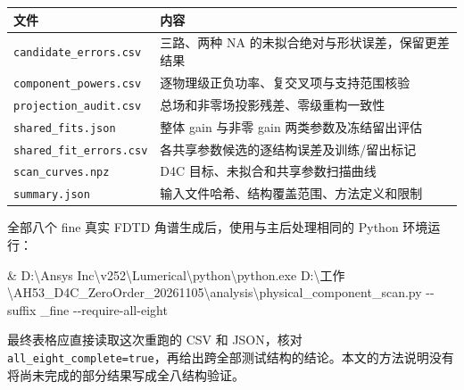 \documentclass[
  chinese,
  UTF8,
  a4paper,
  11pt]{ctexart}
\newenvironment{Shaded}{}{}
\newcommand{\NormalTok}[1]{#1}
\newcommand{\OperatorTok}[1]{\textcolor[rgb]{0.40,0.40,0.40}{#1}}
\newcommand{\StringTok}[1]{\textcolor[rgb]{0.25,0.44,0.63}{#1}}
\newcounter{none} %
\begin{document}
{\def\LTcaptype{none} %
\begin{longtable}[]{@{}
  >{\raggedright\arraybackslash}p{}
  >{\raggedright\arraybackslash}p{}@{}}
\toprule\noalign{}
\begin{minipage}[b]{\linewidth}\raggedright
文件
\end{minipage} & \begin{minipage}[b]{\linewidth}\raggedright
内容
\end{minipage} \\
\midrule\noalign{}
\endhead
\bottomrule\noalign{}
\endlastfoot
\texttt{candidate\_errors.csv} & 三路、两种 NA
的未拟合绝对与形状误差，保留更差结果 \\
\texttt{component\_powers.csv} &
逐物理级正负功率、复交叉项与支持范围核验 \\
\texttt{projection\_audit.csv} & 总场和非零场投影残差、零级重构一致性 \\
\texttt{shared\_fits.json} & 整体 gain 与非零 gain
两类参数及冻结留出评估 \\
\texttt{shared\_fit\_errors.csv} &
各共享参数候选的逐结构误差及训练/留出标记 \\
\texttt{scan\_curves.npz} & D4C 目标、未拟合和共享参数扫描曲线 \\
\texttt{summary.json} & 输入文件哈希、结构覆盖范围、方法定义和限制 \\
\end{longtable}
}

全部八个 fine 真实 FDTD 角谱生成后，使用与主后处理相同的 Python
环境运行：

\begin{Shaded}
\begin{Highlighting}[]
\OperatorTok{\&} \StringTok{\textquotesingle{}D:\textbackslash{}Ansys Inc\textbackslash{}v252\textbackslash{}Lumerical\textbackslash{}python\textbackslash{}python.exe\textquotesingle{}}\NormalTok{ \textasciigrave{}}
  \StringTok{\textquotesingle{}D:\textbackslash{}工作\textbackslash{}AH53\_D4C\_ZeroOrder\_20261105\textbackslash{}analysis\textbackslash{}physical\_component\_scan.py\textquotesingle{}}\NormalTok{ \textasciigrave{}}
  \OperatorTok{{-}{-}}\NormalTok{suffix \_fine }\OperatorTok{{-}{-}}\NormalTok{require{-}all{-}eight}
\end{Highlighting}
\end{Shaded}

最终表格应直接读取这次重跑的 CSV 和 JSON，核对
\texttt{all\_eight\_complete=true}，再给出跨全部测试结构的结论。本文的方法说明没有将尚未完成的部分结果写成全八结构验证。
\end{document}
